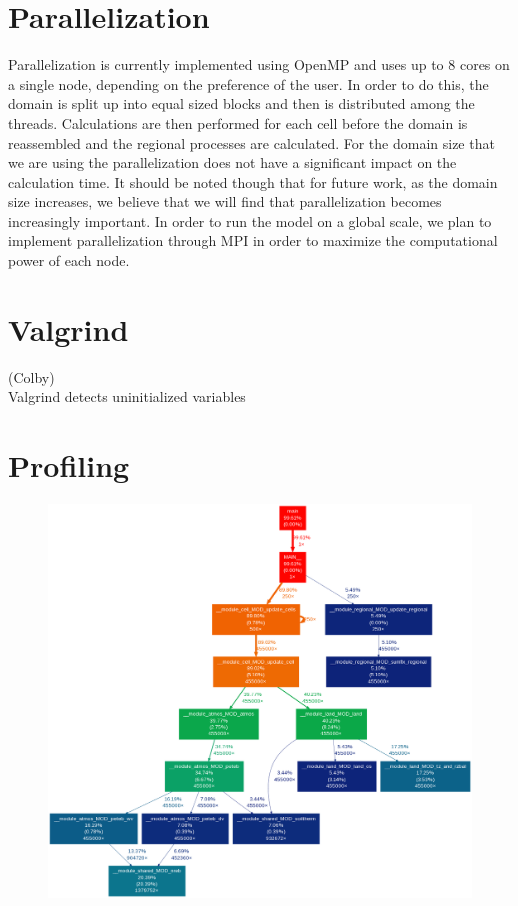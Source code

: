 \documentclass[pdftex,12pt,a4paper]{article}
\begin{document}
\section{Parallelization}
Parallelization is currently implemented using OpenMP and uses up to 8 cores on a single node, depending on the preference of the user.  In order to do this, the domain is split up into equal sized blocks and then is distributed among the threads. Calculations are then performed for each cell before the domain is reassembled and the regional processes are calculated. For the domain size that we are using the parallelization does not have a significant impact on the calculation time. It should be noted though that for future work, as the domain size increases, we believe that we will find that parallelization becomes increasingly important. In order to run the model on a global scale, we plan to implement parallelization through MPI in order to maximize the computational power of each node.

\section{Valgrind}
{(Colby)}
{\\ Valgrind detects uninitialized variables}

\section{Profiling}

\begin{figure}[h]
	\includegraphics[width=5.5in]{Figures/CallGraph.png}
	\label{Profiling1}
	\caption{}
\end{figure}
\end{document}
